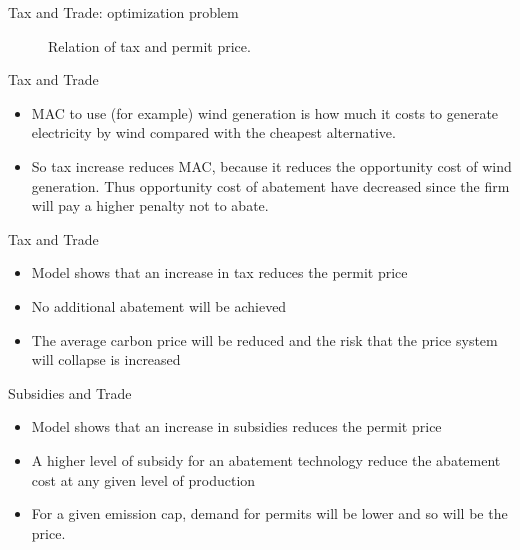 

{Tax and Trade: optimization problem}
\begin{center}
\begin{figure}[h!]
\centering
{}
\caption{Relation of tax and permit price.}
\end{figure}
\end{center}




{Tax and Trade}
\begin{itemize}
\item <1-> MAC to use (for example) wind generation is how much it costs to generate electricity by wind compared with the cheapest alternative. \\
\item <2-> So tax increase reduces MAC, because it reduces the opportunity cost of wind generation. Thus opportunity cost of abatement have decreased since the firm will pay a higher penalty not to abate.
\end{itemize}



{Tax and Trade}
\begin{itemize}
\item<1-> Model shows that an increase in tax reduces the permit price
\item<2-> No additional abatement will be achieved
\item<3-> The average carbon price will be reduced and the risk that the price system will collapse is increased
\end{itemize}




{Subsidies and Trade}
\begin{itemize}
\item<1-> Model shows that an increase in subsidies reduces the permit price
\item<2-> A higher level of subsidy for an abatement technology reduce the abatement cost at any given level of production
\item<3-> For a given emission cap, demand for permits will be lower and so will be the price.
  \end{itemize}



